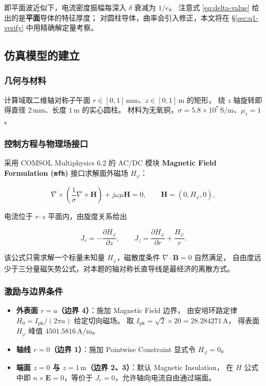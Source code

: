 \documentclass[12pt, a4paper]{ctexart}
\newcommand{\U}[1]{\ensuremath{\,\mathrm{#1}}}
\begin{document}
即平面波近似下，电流密度振幅每深入 $\delta$ 衰减为 $1/e$。
注意式 \eqref{eq:delta-value} 给出的是\textbf{平面}导体的特征厚度；
对圆柱导体，曲率会引入修正，本文将在 \S\ref{sec:q1-verify} 中用精确解定量考察。

\subsection{仿真模型的建立}
\label{sec:q1-model}

\subsubsection{几何与材料}

计算域取二维轴对称子午面 $r\in[0,1]\U{mm}$、$z\in[0,1]\U{m}$ 的矩形，
绕 $z$ 轴旋转即得直径 $2\U{mm}$、长度 $1\U{m}$ 的实心圆柱。
材料为无氧铜，$\sigma = 5.8\times10^{7}\U{S/m}$、$\mu_r = 1$。

\subsubsection{控制方程与物理场接口}

采用 COMSOL Multiphysics 6.2 的 AC/DC 模块 \textbf{Magnetic Field Formulation
(\texttt{mfh})} 接口求解面外磁场 $H_\varphi$：

\begin{equation}
\nabla\times\left(\frac{1}{\sigma}\nabla\times\mathbf H\right) + j\omega\mu\mathbf H = 0,
\qquad \mathbf H = (0, H_\varphi, 0),
\end{equation}

电流位于 $r$--$z$ 平面内，由旋度关系给出

\begin{equation}
J_r = -\frac{\partial H_\varphi}{\partial z},
\qquad
J_z = \frac{\partial H_\varphi}{\partial r} + \frac{H_\varphi}{r}.
\label{eq:JrJz}
\end{equation}

该公式只需求解一个标量未知量 $H_\varphi$，磁散度条件 $\nabla\cdot\mathbf B = 0$ 自然满足，
自由度远少于三分量磁矢势公式，对本题的轴对称长直导线是最经济的离散方式。

\subsubsection{激励与边界条件}

\begin{itemize}[leftmargin=2em, itemsep=2pt]
\item \textbf{外表面 $r = a$（边界 4）}：施加 Magnetic Field 边界，
由安培环路定律 $H_0 = I_{\mathrm{pk}}/(2\pi a)$ 给定切向磁场。
取 $I_{\mathrm{pk}} = \sqrt{2}\times 20 = 28.284271\U{A}$，
得表面 $H_\varphi$ 峰值 $4501.5816\U{A/m}$。
\item \textbf{轴线 $r = 0$（边界 1）}：施加 Pointwise Constraint 显式令 $H_\varphi = 0$。
\item \textbf{端面 $z = 0$ 与 $z = 1\U{m}$（边界 2、3）}：默认 Magnetic Insulation，
在 $H$ 公式中即 $n\times\mathbf E = 0$，等价于 $J_r = 0$，允许轴向电流自由通过端面。
\end{itemize}
\end{document}
